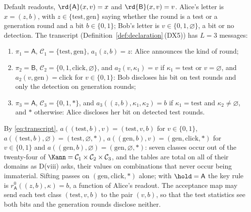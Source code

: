 
\begin{example}\label{ex:transcript}
Default readouts, $\rd{\mathsf A}(x,v)=x$ and $\rd{\mathsf B}(x,v)=v$. Alice's
letter is $x=(z,b)$, with $z\in\{\mathrm{test},\mathrm{gen}\}$ saying whether
the round is a test or a generation round and a bit $b\in\{0,1\}$; Bob's
letter is $v\in\{0,1,\varnothing\}$, a bit or no detection. The transcript
(Definition~\ref{def:declaration}\,(DX5)) has $L=3$ messages:
\begin{enumerate}[label=(m\arabic*),leftmargin=3.0em]
\item $\pi_1=\mathsf A$, $\mathcal{C}_1=\{\mathrm{test},\mathrm{gen}\}$,
  $a_1(z,b)=z$: Alice announces the kind of round;
\item $\pi_2=\mathsf B$,
  $\mathcal{C}_2=\{0,1,\mathrm{click},\varnothing\}$, and
  $a_2(v,\kappa_1)=v$ if $\kappa_1=\mathrm{test}$ or $v=\varnothing$, and
  $a_2(v,\mathrm{gen})=\mathrm{click}$ for $v\in\{0,1\}$: Bob discloses his
  bit on test rounds and only the detection on generation rounds;
\item $\pi_3=\mathsf A$, $\mathcal{C}_3=\{0,1,\ast\}$, and
  $a_3((z,b),\kappa_1,\kappa_2)=b$ if $\kappa_1=\mathrm{test}$ and
  $\kappa_2\ne\varnothing$, and $\ast$ otherwise: Alice discloses her bit on
  detected test rounds.
\end{enumerate}
By \eqref{eq:transcript}, $a((\mathrm{test},b),v)=(\mathrm{test},v,b)$ for
$v\in\{0,1\}$, $a((\mathrm{test},b),\varnothing)
=(\mathrm{test},\varnothing,\ast)$,
$a((\mathrm{gen},b),v)=(\mathrm{gen},\mathrm{click},\ast)$ for $v\in\{0,1\}$
and $a((\mathrm{gen},b),\varnothing)=(\mathrm{gen},\varnothing,\ast)$: seven
classes occur out of the twenty-four of
$\Kann=\mathcal{C}_1\times\mathcal{C}_2\times\mathcal{C}_3$, and the tables
are total on all of their domains as D(viii) asks, their values on
combinations that never occur being immaterial. Sifting passes on
$(\mathrm{gen},\mathrm{click},\ast)$ alone; with $\hold=\mathsf A$ the key
rule is $r^{0}_{\mathsf A}((z,b),\kappa)=b$, a function of Alice's readout.
The acceptance map may send each test class $(\mathrm{test},v,b)$ to the
pair $(v,b)$, so that the test statistics see both bits and the generation
rounds disclose neither.


\end{example}

